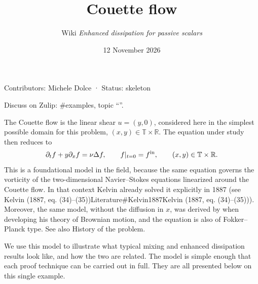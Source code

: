 \documentclass[11pt]{article}
\makeatletter
\theoremstyle{definition}
\theoremstyle{remark}
\def\ed@title{}\let\ed@maketitle\maketitle\renewcommand{\maketitle}{\let\ed@title\@title\ed@maketitle}
\newcommand{\pagestatus}[1]{{\par\centering\small#1\par}}
\newcommand{\zulip}[2][]{{\par\centering\small Discuss on Zulip: \##2, topic
  ``\ifx\relax#1\relax\ed@title\else#1\fi''.\par}\medskip}
\newcommand{\wikilink}[2]{\ifx\relax#2\relax#1\else#2\fi}
\makeatother
\begin{document}
\title{Couette flow}
\author{Wiki \emph{Enhanced dissipation for passive scalars}}
\date{12 November 2026}
\maketitle
\pagestatus{Contributors: Michele Dolce · Status: skeleton}
\zulip{examples}

The Couette flow is the linear shear $u=(y,0)$, considered here in the simplest possible domain for this problem, $(x,y)\in\mathbb{T}\times\mathbb{R}$. The equation under study then reduces to
\[\partial_t f+y\partial_xf=\nu\Delta f, \qquad f|_{t=0}=f^{\rm in}, \qquad (x,y)\in \mathbb{T}\times\mathbb{R}.\]
This is a foundational model in the field, because the same equation governs the vorticity of the two-dimensional Navier–Stokes equations linearized around the Couette flow. In that context Kelvin already solved it explicitly in 1887 (see \wikilink{Literature\#Kelvin1887}{Kelvin (1887, eq. (34)–(35))}). Moreover, the same model, without the diffusion in $x$, was derived by \citet{Kolmogorov1934} when developing his theory of Brownian motion, and the equation is also of Fokker–Planck type. See also \wikilink{History of the problem}{}.

We use this model to illustrate what typical mixing and enhanced dissipation results look like, and how the two are related. The model is simple enough that each proof technique can be carried out in full. They are all presented below on this single example.
\end{document}
